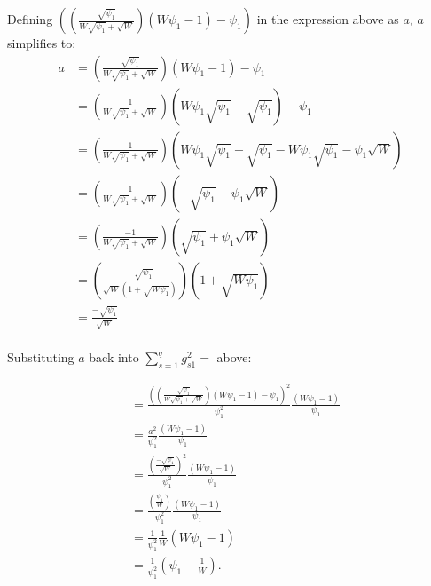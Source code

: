 Defining $\left(\left(\frac{\sqrt{\psi_1}}{W \sqrt{\psi_1} + \sqrt{W}}\right)(W \psi_1 - 1) - \psi_1\right)$ in the expression above as $a$, $a$ simplifies to:
\begin{equation}
    \begin{aligned}
    a &=\left(\frac{\sqrt{\psi_1}}{W \sqrt{\psi_1} + \sqrt{W}}\right) \left(W \psi_1 - 1 \right) - \psi_1 \\
     &=\left(\frac{1}{W \sqrt{\psi_1} + \sqrt{W}}\right)\left(W \psi_1\sqrt{\psi_1} - \sqrt{\psi_1}\right) - \psi_1 \\
     &=\left(\frac{1}{W \sqrt{\psi_1} + \sqrt{W}}\right)\left(W \psi_1\sqrt{\psi_1} - \sqrt{\psi_1} - W\psi_1\sqrt{\psi_1} - \psi_1\sqrt{W} \right) \\
     &=\left(\frac{1}{W \sqrt{\psi_1} + \sqrt{W}}\right)\left( - \sqrt{\psi_1}  - \psi_1\sqrt{W} \right) \\
     &=\left(\frac{-1}{W \sqrt{\psi_1} + \sqrt{W}}\right)\left( \sqrt{\psi_1}  + \psi_1\sqrt{W} \right) \\
     &=\left(\frac{-\sqrt{\psi_1}}{\sqrt{W} \left(1 + \sqrt{W\psi_1}\right) }\right)\left( 1  + \sqrt{W\psi_1} \right) \\
     &=\frac{-\sqrt{\psi_1}}{\sqrt{W}  } \\
    \end{aligned}
    \nonumber
\end{equation}

Substituting $a$ back into $\sum_{s=1}^q g_{s1}^2=$ above:

\begin{equation}
    \begin{aligned}
        &= \frac{\left(\left( \frac{\sqrt{\psi_1}}{W \sqrt{\psi_1} + \sqrt{W}}\right)(W \psi_1 - 1) - \psi_1\right)^2}{\psi_1^2} \frac{(W \psi_1 - 1)}{\psi_1} \\
        &= \frac{a^2}{\psi_1^2} \frac{(W \psi_1 - 1)}{\psi_1} \\
        &= \frac{\left(\frac{-\sqrt{\psi_1}}{\sqrt{W}  }\right)^2}{\psi_1^2} \frac{(W \psi_1 - 1)}{\psi_1} \\
        &= \frac{\left(\frac{\psi_1}{W  }\right)}{\psi_1^2} \frac{(W \psi_1 - 1)}{\psi_1} \\
        &= \frac{1}{\psi_1^2}\frac{1}{W}  (W \psi_1 - 1) \\
        &= \frac{1}{\psi_1^2} \left(\psi_1 - \frac{1}{W}\right).
    \end{aligned}
    \nonumber
\end{equation}


